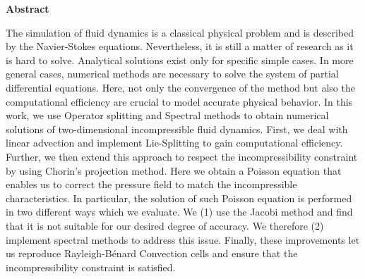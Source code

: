 \thispagestyle{empty}


\vspace*{1cm}

\begin{center}
    \textbf{Abstract}
    
\end{center}
    The simulation of fluid dynamics is a classical physical problem and is described by the Navier-Stokes equations. 
    Nevertheless, it is still a matter of research as it is hard to solve.
    Analytical solutions exist only for specific simple cases.
    In more general cases, numerical methods are necessary to solve the system of partial differential equations.
    Here, not only the convergence of the method but also the computational efficiency are crucial to model accurate physical behavior.
    In this work, we use Operator splitting and Spectral methods to obtain numerical solutions of two-dimensional incompressible fluid dynamics.
    First, we deal with linear advection and implement Lie-Splitting to gain computational efficiency.
    Further, we then extend this approach to respect the incompressibility constraint by using Chorin's projection method.
    Here we obtain a Poisson equation that enables us to correct the pressure field to match the incompressible characteristics.
    In particular, the solution of such Poisson equation is performed in two different ways which we evaluate.
    We (1) use the Jacobi method and find that it is not suitable for our desired degree of accuracy. 
    We therefore (2) implement spectral methods to address this issue.
    Finally, these improvements let us reproduce Rayleigh-B\'{e}nard Convection cells and ensure that the incompressibility constraint is satisfied.
\vspace*{1cm}

